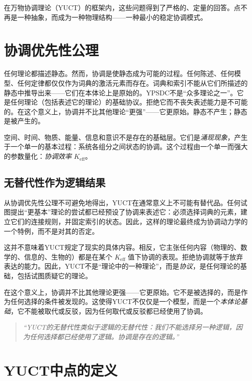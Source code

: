 \documentclass[12pt,a4paper]{article}
\newcommand{\Keff}{K_{\mathrm{eff}}}
\begin{document}
	在万物协调理论（YUCT）的框架内，这些问题得到了严格的、定量的回答。点不再是一种抽象，而成为一种物理结构——一种最小的稳定协调模式。
	
	\section*{协调优先性公理}
	
	任何理论都描述静态。然而，协调是使静态成为可能的过程。任何陈述、任何模型、任何定律都仅仅作为词典的激活元素而存在。词典和索引不能从它们所描述的静态中推导出来——它们在本体论上是原始的。YPSDC不是“众多理论之一”。它是任何理论（包括表述它的理论）的基础协议。拒绝它而不丧失表述能力是不可能的。在这个意义上，协调并不比其他理论“更强”——它更原始。静态不产生；静态是被产生的。
	
	空间、时间、物质、能量、信息和意识不是存在的基础层。它们是\emph{涌现现象}，产生于一个单一的基本过程：系统各组分之间状态的协调。这个过程由一个单一而强大的参数量化：\emph{协调效率} \(\Keff\)。
	
	\subsection*{无替代性作为逻辑结果}
	
	从协调优先性公理不可避免地得出，YUCT在通常意义上不可能有替代品。任何试图提出“更基本”理论的尝试都已经预设了协调来表述它：必须选择词典的元素，建立它们的连接规则，并固定索引的状态。因此，这样的理论最终成为协调动力学的一个特例，而不是对其的否定。
	
	这并不意味着YUCT规定了现实的具体内容。相反，它主张任何内容（物理的、数学的、信息的、生物的）都是在某个 \(\Keff\) 值下协调的表现。拒绝协调就等于放弃表达的能力。因此，YUCT不是“理论中的一种理论”，而是\emph{协议}，是任何理论的基础，包括试图质疑它的理论。
	
	在这个意义上，协调并不比其他理论更强——它更原始。它不是被选择的，而是作为任何选择的条件被发现的。这使得YUCT不仅仅是一个模型，而是一个\emph{本体论基础}，它不能被取代或反驳，因为任何取代或反驳都已经使用了协调。
	
	\begin{quote}
		\itshape
		“YUCT的无替代性类似于逻辑的无替代性：我们不能选择另一种逻辑，因为任何选择都已经使用了逻辑。协调是存在的逻辑。”
	\end{quote}
	
	\section{YUCT中点的定义}
	
\end{document}
